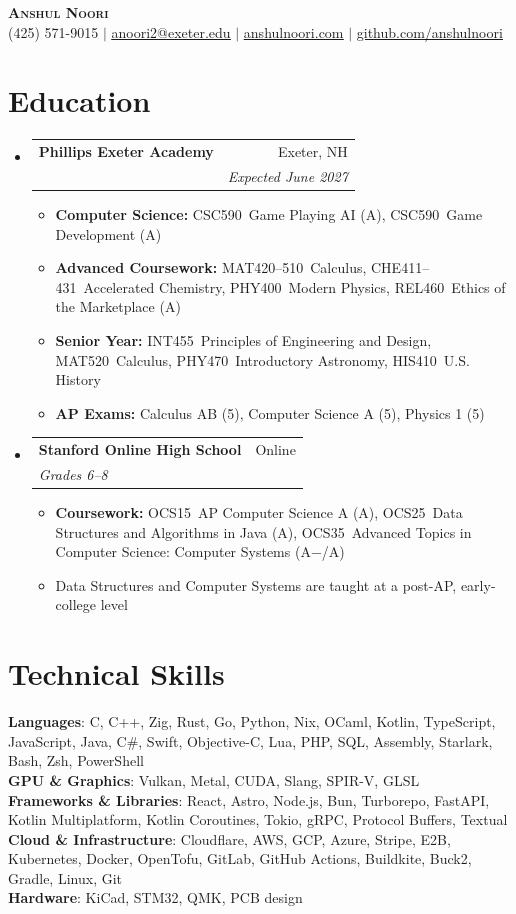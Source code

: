 \documentclass[letterpaper,11pt]{article}
\makeatletter
\newcommand{\resumeItem}[1]{
  \item\small{
    {#1 \vspace{-2pt}}
  }
}
\newcommand{\resumeSubheading}[4]{
  \vspace{-2pt}\item
    \begin{tabular*}{0.97\textwidth}[t]{l@{\extracolsep{\fill}}r}
      \textbf{#1} & #2 \\
      \textit{\small#3} & \textit{\small #4} \\
    \end{tabular*}\vspace{-7pt}
}
\newcommand{\resumeSubHeadingListStart}{\begin{itemize}[leftmargin=0.15in, label={}]}
\newcommand{\resumeSubHeadingListEnd}{\end{itemize}}
\newcommand{\resumeItemListStart}{\begin{itemize}}
\newcommand{\resumeItemListEnd}{\end{itemize}\vspace{-5pt}}
\makeatother
\begin{document}
\begin{center}
    \textbf{\Huge \scshape Anshul Noori} \\ \vspace{1pt}
    \small (425) 571-9015 $|$ \href{mailto:anoori2@exeter.edu}{\underline{anoori2@exeter.edu}} $|$
    \href{https://anshulnoori.com}{\underline{anshulnoori.com}} $|$
    \href{https://github.com/anshulnoori}{\underline{github.com/anshulnoori}}
\end{center}


\section{Education}
  \resumeSubHeadingListStart
    \resumeSubheading
      {Phillips Exeter Academy}{Exeter, NH}
      {}{Expected June 2027}
      \resumeItemListStart
        \resumeItem{\textbf{Computer Science:} CSC590~Game Playing AI (A), CSC590~Game Development (A)}
        \resumeItem{\textbf{Advanced Coursework:} MAT420--510~Calculus, CHE411--431~Accelerated Chemistry, PHY400~Modern Physics, REL460~Ethics of the Marketplace (A)}
        \resumeItem{\textbf{Senior Year:} INT455~Principles of Engineering and Design, MAT520~Calculus, PHY470~Introductory Astronomy, HIS410~U.S. History}
        \resumeItem{\textbf{AP Exams:} Calculus AB (5), Computer Science A (5), Physics 1 (5)}
      \resumeItemListEnd
    \resumeSubheading
      {Stanford Online High School}{Online}
      {Grades 6--8}{}
      \resumeItemListStart
        \resumeItem{\textbf{Coursework:} OCS15~AP Computer Science A (A), OCS25~Data Structures and Algorithms in Java (A), OCS35~Advanced Topics in Computer Science: Computer Systems (A$-$/A)}
        \resumeItem{Data Structures and Computer Systems are taught at a post-AP, early-college level}
      \resumeItemListEnd
  \resumeSubHeadingListEnd


\section{Technical Skills}
 \begin{itemize}[leftmargin=0.15in, label={}]
    \small{\item{
     \textbf{Languages}{: C, C++, Zig, Rust, Go, Python, Nix, OCaml, Kotlin, TypeScript, JavaScript, Java, C\#, Swift, Objective-C, Lua, PHP, SQL, Assembly, Starlark, Bash, Zsh, PowerShell} \\
     \textbf{GPU \& Graphics}{: Vulkan, Metal, CUDA, Slang, SPIR-V, GLSL} \\
     \textbf{Frameworks \& Libraries}{: React, Astro, Node.js, Bun, Turborepo, FastAPI, Kotlin Multiplatform, Kotlin Coroutines, Tokio, gRPC, Protocol Buffers, Textual} \\
     \textbf{Cloud \& Infrastructure}{: Cloudflare, AWS, GCP, Azure, Stripe, E2B, Kubernetes, Docker, OpenTofu, GitLab, GitHub Actions, Buildkite, Buck2, Gradle, Linux, Git} \\
     \textbf{Hardware}{: KiCad, STM32, QMK, PCB design}
    }}
 \end{itemize}
\end{document}
